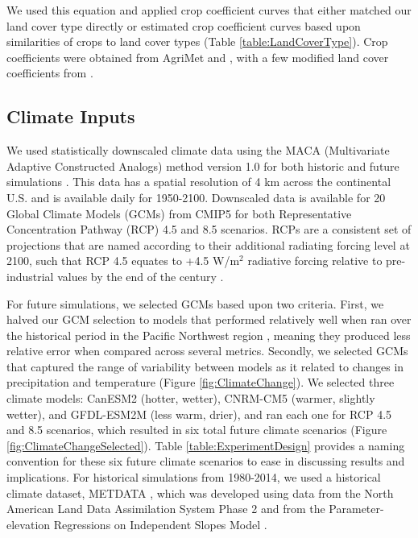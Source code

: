 \documentclass[11pt,letterpaper]{article}
\begin{document}
We used this equation and applied crop coefficient curves that either matched our land cover type directly or estimated crop coefficient curves based upon similarities of crops to land cover types (Table \ref{table:LandCoverType}). Crop coefficients were obtained from AgriMet and \citep{Allen:2007ta}, with a few modified land cover coefficients from \citep{Inouye:2014ws}.  

\subsection{Climate Inputs}

We used statistically downscaled climate data using the MACA (Multivariate Adaptive Constructed Analogs) method version 1.0 for both historic and future simulations \citep{Abatzoglou:2011kca}. This data has a spatial resolution of 4 km across the continental U.S. and is available daily for 1950-2100. Downscaled data is available for 20 Global Climate Models (GCMs) from CMIP5 for both Representative Concentration Pathway (RCP) 4.5 and 8.5 scenarios. RCPs are a consistent set of projections that are named according to their additional radiating forcing level at 2100, such that RCP 4.5 equates to +4.5 W/m${}^2$ radiative forcing relative to pre-industrial values by the end of the century \citep{vanVuuren:2011tu}. 

For future simulations, we selected GCMs based upon two criteria. First, we halved our GCM selection to models that performed relatively well when ran over the historical period in the Pacific Northwest region \citep{Rupp:2013ea}, meaning they produced less relative error when compared across several metrics. Secondly, we selected GCMs that captured the range of variability between models as it related to changes in precipitation and temperature (Figure \ref{fig:ClimateChange}). We selected three climate models: CanESM2 (hotter, wetter), CNRM-CM5 (warmer, slightly wetter), and GFDL-ESM2M (less warm, drier), and ran each one for RCP 4.5 and 8.5 scenarios, which resulted in six total future climate scenarios (Figure \ref{fig:ClimateChangeSelected}). Table \ref{table:ExperimentDesign} provides a naming convention for these six future climate scenarios to ease in discussing results and implications. For historical simulations from 1980-2014, we used a historical climate dataset, METDATA \citep{Abatzoglou:2011em}, which was developed using data from the North American Land Data Assimilation System Phase 2 \citep[NLDAS-2,][]{Mitchell:2004hf} and from the Parameter-elevation Regressions on Independent Slopes Model \citep[PRISM,][]{Daly:2008hsa}.  
\end{document}
